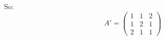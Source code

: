 \documentclass[12pt]{article}
\begin{document}
\begin{answerbox}
\begin{enumerate}
\begin{enumerate}
        So:
        $$
        A' = 
        \begin{pmatrix}
        1 & 1 & 2 \\
        1 & 2 & 1 \\
        2 & 1 & 1
        \end{pmatrix}
        $$
    \end{enumerate}
\end{enumerate}
\end{answerbox}

\end{document}
